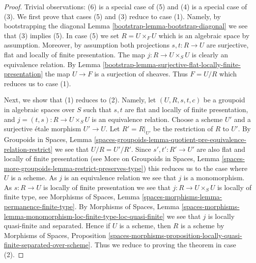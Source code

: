 \begin{proof}

Trivial observations: (6) is a special case of (5) and
(4) is a special case of (3).
We first prove that cases (5) and (3) reduce to case (1).
Namely, by bootstrapping the diagonal
Lemma \ref{bootstrap-lemma-bootstrap-diagonal}
we see that (3) implies (5). In case (5) we set $R = U \times_F U$ which
is an algebraic space by assumption. Moreover, by assumption both
projections $s, t : R \to U$ are surjective, flat and locally of
finite presentation. The map $j : R \to U \times_S U$ is clearly an
equivalence relation. By
Lemma \ref{bootstrap-lemma-surjective-flat-locally-finite-presentation}
the map $U \to F$ is a surjection of sheaves. Thus $F = U/R$
which reduces us to case (1).

\medskip\noindent
Next, we show that (1) reduces to (2).
Namely, let $(U, R, s, t, c)$ be a groupoid in algebraic spaces
over $S$ such that $s, t$ are flat and locally of finite presentation, and
$j = (t, s) : R \to U \times_S U$ is an equivalence relation.
Choose a scheme $U'$ and a surjective \'etale morphism $U' \to U$.
Let $R' = R|_{U'}$ be the restriction of $R$ to $U'$. By
Groupoids in Spaces,
Lemma \ref{spaces-groupoids-lemma-quotient-pre-equivalence-relation-restrict}
we see that $U/R = U'/R'$. Since $s', t' : R' \to U'$ are also
flat and locally of finite presentation (see
More on Groupoids in Spaces,
Lemma \ref{spaces-more-groupoids-lemma-restrict-preserves-type})
this reduces us to the case where $U$ is a scheme.
As $j$ is an equivalence relation we see that $j$ is a monomorphism.
As $s : R \to U$ is locally of finite presentation we see that
$j : R \to U \times_S U$ is locally of finite type, see
Morphisms of Spaces, Lemma \ref{spaces-morphisms-lemma-permanence-finite-type}.
By
Morphisms of Spaces, Lemma
\ref{spaces-morphisms-lemma-monomorphism-loc-finite-type-loc-quasi-finite}
we see that $j$ is locally quasi-finite and separated.
Hence if $U$ is a scheme, then $R$ is a scheme by
Morphisms of Spaces, Proposition
\ref{spaces-morphisms-proposition-locally-quasi-finite-separated-over-scheme}.
Thus we reduce to proving the theorem in case (2).


\end{proof}
